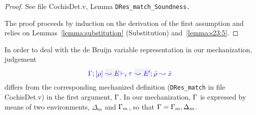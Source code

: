 {\centering
{}}
\begin{proof}
See file CochisDet.v, Lemma \tt{DRes\_match\_Soundness}.

The proof proceeds by induction on the derivation of the first assumption and relies on Lemmas~\ref{lemma:substitution} (Substitution) and~\ref{lemma:s23:5}.
\end{proof}
In order to deal with the de Bruijn variable representation in our mechanization,
judgement
\begin{equation*}
  \dmres{\tenv}{\rulet}{E}{\type}{E'}{\bar{\rulet} \leadsto \bar{x}}
\end{equation*}
differs from the corresponding mechanized definition (\texttt{DRes\_match} in file CochisDet.v) in the first argument, $\Gamma$. In our mechanization, $\Gamma$ is expressed by means of two environments, $\Delta_m$ and $\Gamma_m$, so that $\Gamma = \Gamma_m,\Delta_m$.

{\centering
{}}

